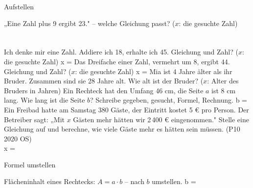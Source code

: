 \setcounter{aufgabe}{18}

\begin{aufgabe}{Aufstellen}
\begin{teile}
\teil „Eine Zahl plus 9 ergibt 23." – welche Gleichung passt? ($x$: die gesuchte Zahl) \\  \\  \\ 
\teil Ich denke mir eine Zahl. Addiere ich 18, erhalte ich 45. Gleichung und Zahl? ($x$: die gesuchte Zahl) x = \leerfeld
\teil Das Dreifache einer Zahl, vermehrt um 8, ergibt 44. Gleichung und Zahl? ($x$: die gesuchte Zahl) x = \leerfeld
\teil Mia ist 4 Jahre älter als ihr Bruder. Zusammen sind sie 28 Jahre alt. Wie alt ist der Bruder? ($x$: Alter des Bruders in Jahren) \leerfeld[Jahre]
\teil Ein Rechteck hat den Umfang 46 cm, die Seite $a$ ist 8 cm lang. Wie lang ist die Seite $b$? Schreibe gegeben, gesucht, Formel, Rechnung. b = \leerfeld[cm]
\teil Ein Freibad hatte am Samstag 380 Gäste, der Eintritt kostet 5 € pro Person. Der Betreiber sagt: „Mit $x$ Gästen mehr hätten wir 2\,400 € eingenommen." Stelle eine Gleichung auf und berechne, wie viele Gäste mehr es hätten sein müssen. \hfill (P10 2020 OS) \\ x = \leerfeld
\end{teile}
\end{aufgabe}

\begin{aufgabe}{Formel umstellen}
\begin{teile}
\teil Flächeninhalt eines Rechtecks: $A = a \cdot b$ – nach $b$ umstellen. b = \leerfeld
\end{teile}
\end{aufgabe}

